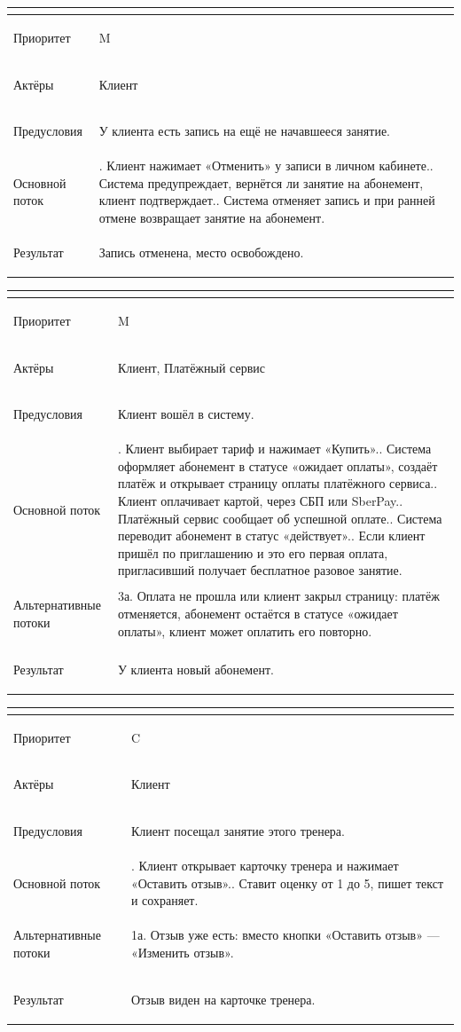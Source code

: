 \documentclass[14pt,a4paper]{extarticle}
\newenvironment{usecase}[2]{%
  \par\medskip\noindent\begingroup\small\setstretch{1.1}%
  \begin{tabular}{|>{\bfseries\raggedright\arraybackslash}p{4.2cm}|>{\raggedright\arraybackslash}p{\dimexpr\textwidth-4.2cm-4\tabcolsep-3\arrayrulewidth\relax}|}
  \hline
  \multicolumn{2}{|l|}{\normalsize\textbf{#1. #2}}\\ \hline
}{%
  \end{tabular}
  \endgroup\par\medskip
}
\newcommand{\ucrow}[2]{#1 & #2 \\ \hline}
\begin{document}
\begin{usecase}{Прецедент П-4}{Отмена записи}
\ucrow{Приоритет}{M}
\ucrow{Актёры}{Клиент}
\ucrow{Предусловия}{У клиента есть запись на ещё не начавшееся занятие.}
\ucrow{Основной поток}{%
1. Клиент нажимает «Отменить» у записи в личном кабинете.\newline
2. Система предупреждает, вернётся ли занятие на абонемент, клиент подтверждает.\newline
3. Система отменяет запись и при ранней отмене возвращает занятие на абонемент.}
\ucrow{Результат}{Запись отменена, место освобождено.}
\end{usecase}

\begin{usecase}{Прецедент П-5}{Покупка абонемента}
\ucrow{Приоритет}{M}
\ucrow{Актёры}{Клиент, Платёжный сервис}
\ucrow{Предусловия}{Клиент вошёл в систему.}
\ucrow{Основной поток}{%
1. Клиент выбирает тариф и нажимает «Купить».\newline
2. Система оформляет абонемент в статусе «ожидает оплаты», создаёт платёж и открывает страницу оплаты платёжного сервиса.\newline
3. Клиент оплачивает картой, через СБП или SberPay.\newline
4. Платёжный сервис сообщает об успешной оплате.\newline
5. Система переводит абонемент в статус «действует».\newline
6. Если клиент пришёл по приглашению и это его первая оплата, пригласивший получает бесплатное разовое занятие.}
\ucrow{Альтернативные потоки}{%
3а. Оплата не прошла или клиент закрыл страницу: платёж отменяется, абонемент остаётся в статусе «ожидает оплаты», клиент может оплатить его повторно.}
\ucrow{Результат}{У клиента новый абонемент.}
\end{usecase}

\begin{usecase}{Прецедент П-6}{Отзыв о тренере}
\ucrow{Приоритет}{C}
\ucrow{Актёры}{Клиент}
\ucrow{Предусловия}{Клиент посещал занятие этого тренера.}
\ucrow{Основной поток}{%
1. Клиент открывает карточку тренера и нажимает «Оставить отзыв».\newline
2. Ставит оценку от 1 до 5, пишет текст и сохраняет.}
\ucrow{Альтернативные потоки}{%
1а. Отзыв уже есть: вместо кнопки «Оставить отзыв» --- «Изменить отзыв».}
\ucrow{Результат}{Отзыв виден на карточке тренера.}
\end{usecase}
\end{document}
